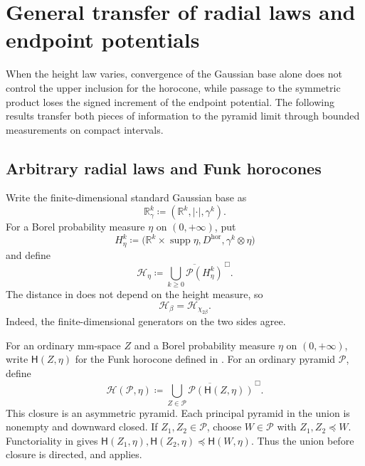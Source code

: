\documentclass{amsart}
\numberwithin{equation}{section}
\theoremstyle{plain}
\theoremstyle{definition}
\theoremstyle{remark}
\newcommand{\R}{\mathbb R}
\newcommand{\Pyr}{\mathcal P}
\DeclareMathOperator{\supp}{supp}
\begin{document}
\section{General transfer of radial laws and endpoint potentials}\label{sec:general-transfer}

When the height law varies, convergence of the Gaussian base alone does not control the upper inclusion for the horocone,
while passage to the symmetric product loses the signed increment of the endpoint potential.  The following results transfer
both pieces of information to the pyramid limit through bounded measurements on compact intervals.

\subsection{Arbitrary radial laws and Funk horocones}

Write the finite-dimensional standard Gaussian base as
\begin{equation}\label{eq:Gaussian-base-space} \mathbb R_\gamma^k\coloneqq(\R^k,|\cdot|,\gamma^k). \end{equation}
For a Borel probability measure $\eta$ on $(0,+\infty)$, put
\begin{equation}\label{eq:general-height-generator}
 H_\eta^k\coloneqq\bigl(\R^k\times\supp\eta,D^{\mathrm{hor}},\gamma^k\otimes\eta\bigr)
\end{equation}
and define
\begin{equation}\label{eq:general-horocone-pyramid}
 \mathcal H_\eta\coloneqq\overline{\bigcup_{k\ge0}\Pyr(H_\eta^k)}^{\,\Box}.
\end{equation}
The distance in  does not depend on the height measure, so
\begin{equation}\label{eq:Hbeta-height-specialization} \mathcal H_\beta=\mathcal H_{\chi_{2\beta}}. \end{equation}
Indeed, the finite-dimensional generators on the two sides agree.

For an ordinary mm-space $Z$ and a Borel probability measure $\eta$ on $(0,+\infty)$, write
$\mathsf H(Z,\eta)$ for the Funk horocone defined in .  For an ordinary pyramid
$\mathcal P$, define
\begin{equation}\label{eq:joint-horocone-pyramid}
 \mathcal H(\mathcal P,\eta)
 \coloneqq\overline{\bigcup_{Z\in\mathcal P}
 \Pyr(\mathsf H(Z,\eta))}^{\,\Box}.
\end{equation}
This closure is an asymmetric pyramid.  Each principal pyramid in the union is nonempty and downward closed.  If
$Z_1,Z_2\in\mathcal P$, choose $W\in\mathcal P$ with $Z_1,Z_2\preceq W$.  Functoriality in
 gives
$\mathsf H(Z_1,\eta),\mathsf H(Z_2,\eta)\preceq\mathsf H(W,\eta)$.  Thus the union before closure is directed, and
 applies.
\end{document}
